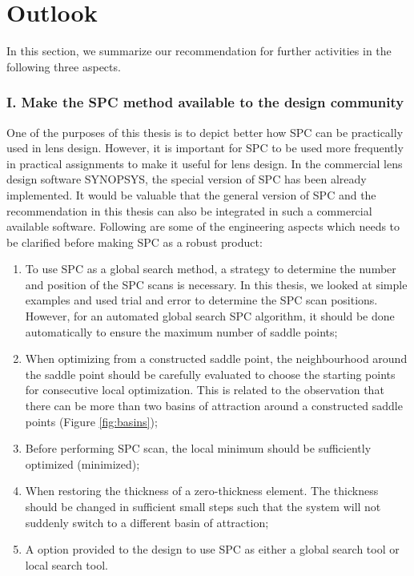 \section{Outlook}
In this section, we summarize our recommendation for further activities in the following three aspects.

\subsubsection{I. Make the SPC method available to the design community}

One of the purposes of this thesis is to depict better how SPC can be practically used in lens design. However, it is important for SPC to be used more frequently in practical assignments to make it useful for lens design. In the commercial lens design software SYNOPSYS\texttrademark \cite{SYNOPSYSSW}, the special version of SPC has been already implemented. It would be valuable that the general version of SPC and the recommendation in this thesis can also be integrated in such a commercial available software. Following are some of the engineering aspects which needs to be clarified before making SPC as a robust product:
\vspace{-\topsep}
\begin{enumerate}[noitemsep]
\item To use SPC as a global search method, a strategy to determine the number and position of the SPC scans is necessary. In this thesis, we looked at simple examples and used trial and error to determine the SPC scan positions. However, for an automated global search SPC algorithm, it should be done automatically to ensure the maximum number of saddle points;
\item When optimizing from a constructed saddle point, the neighbourhood around the saddle point should be carefully evaluated to choose the starting points for consecutive local optimization. This is related to the observation that there can be more than two basins of attraction around a constructed saddle points (Figure \ref{fig:basins});
\item Before performing SPC scan, the local minimum should be sufficiently optimized (minimized); 
\item When restoring the thickness of a zero-thickness element. The thickness should be changed in sufficient small steps such that the system will not suddenly switch to a different basin of attraction; 
\item  A option provided to the design to use SPC as either a global search tool or local search tool. 
\end{enumerate}


